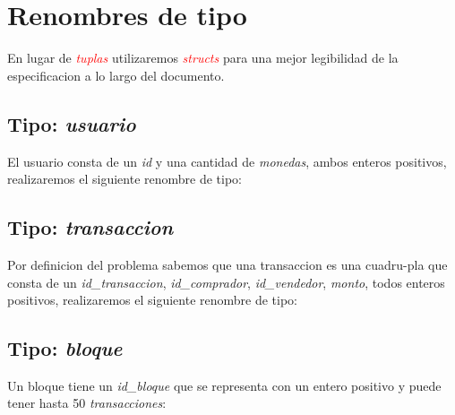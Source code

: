 \documentclass[10pt,a4paper]{article}
\begin{document}
\maketitle

\section{Renombres de tipo}
En lugar de \textcolor{red}{\textit{tuplas}} utilizaremos \textcolor{red}{\textit{structs}} para una mejor legibilidad de la especificacion a lo largo del documento.
\subsection{Tipo: \textit{usuario}}
El usuario consta de un \textit{id} y una cantidad de \textit{monedas}, ambos enteros positivos, realizaremos el siguiente renombre de tipo:

\vspace{0.3cm}
\noindent
{}
\vspace{0.1cm}

\subsection{Tipo: \textit{transaccion}}
Por definicion del problema sabemos que una transaccion es una cuadru-pla que consta de un \textit{id\_transaccion}, \textit{id\_comprador}, \textit{id\_vendedor}, \textit{monto}, todos enteros positivos, realizaremos el siguiente renombre de tipo:

\vspace{0.3cm}
\noindent
{}
\vspace{0.1cm}

\subsection{Tipo: \textit{bloque}}
Un bloque tiene un \textit{id\_bloque} que se representa con un entero positivo y puede tener hasta 50 \textit{transacciones}:
\end{document}
